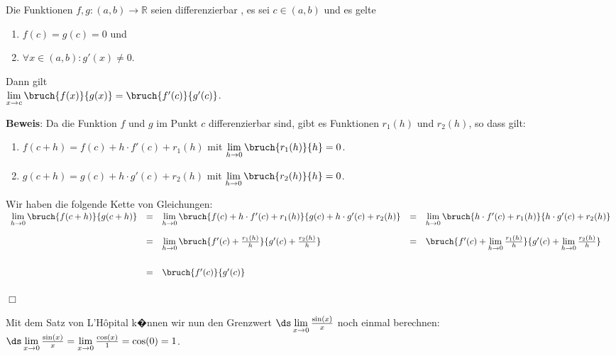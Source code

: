 \begin{Satz} \lb 
  Die Funktionen $f,g: (a,b) \rightarrow \mathbb{R}$ seien
  differenzierbar , es sei $c \in (a,b)$ und es gelte
  \begin{enumerate}
  \item $f(c) = g(c) = 0$ \quad und
  \item $\forall x \in (a,b):  g'(x) \not= 0$.
  \end{enumerate}
  Dann gilt 
  \\[0.3cm]
  \hspace*{1.3cm}
  $\lim\limits_{x \rightarrow c} \bruch{f(x)}{g(x)} = \bruch{f'(c)}{g'(c)}$.
\end{Satz}

\noindent
\textbf{Beweis}: 
Da die Funktion $f$ und $g$ im Punkt $c$ differenzierbar sind, gibt es Funktionen $r_1(h)$
und $r_2(h)$, so dass gilt:
\begin{enumerate}
\item $f(c+h) = f(c) + h\cdot f'(c) + r_1(h)$ \quad mit $\lim\limits_{h \rightarrow 0} \bruch{r_1(h)}{h} = 0$.
\item $g(c+h) = g(c) + h\cdot g'(c) + r_2(h)$ \quad mit $\lim\limits_{h \rightarrow 0} \bruch{r_2(h)}{h} = 0$.
\end{enumerate}
Wir haben die folgende Kette von Gleichungen:
\\[0.3cm]
\hspace*{1.3cm}
$
\begin{array}[b]{lclcl}
    \lim\limits_{h \rightarrow 0} \bruch{f(c+h)}{g(c+h)} &=&
    \lim\limits_{h \rightarrow 0} \bruch{f(c) + h\cdot f'(c) + r_1(h)}{g(c) + h\cdot g'(c) + r_2(h)} 
&=& \lim\limits_{h \rightarrow 0} \bruch{h\cdot f'(c) + r_1(h)}{h\cdot g'(c) + r_2(h)} \\[0.5cm]
&=& \lim\limits_{h \rightarrow 0} \bruch{f'(c) + \frac{r_1(h)}{h}}{g'(c) + \frac{r_2(h)}{h}} 
&=& \bruch{f'(c) + \lim\limits_{h \rightarrow 0} \frac{r_1(h)}{h}}{g'(c) + \lim\limits_{h \rightarrow 0} \frac{r_2(h)}{h}} \\[0.8cm]
&=& \bruch{f'(c)}{g'(c)} \\[0.5cm]
\end{array}
$
\hspace*{\fill} $\Box$
\pagebreak

\example
Mit dem Satz von L'H\^opital k�nnen wir nun den Grenzwert
$\ds\lim\limits_{x \rightarrow 0} \frac{\sin(x)}{x}$ noch einmal berechnen: 
\\[0.3cm]
\hspace*{1.3cm} $\ds\lim\limits_{x \rightarrow 0} \frac{\sin(x)}{x} = \lim\limits_{x \rightarrow 0}
\frac{\cos(x)}{1} = \cos(0) = 1$.
\eox
\vspace*{0.3cm}

